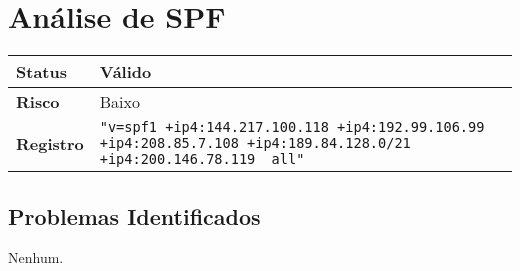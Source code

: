 
    \section{Análise de SPF}
    \begin{tabularx}{\textwidth}{|l|X|}
    \hline
    \textbf{Status} & Válido \\ \hline
    \textbf{Risco} & Baixo \\ \hline
    \textbf{Registro} & \texttt{"v=spf1 +ip4:144.217.100.118 +ip4:192.99.106.99 +ip4:208.85.7.108  +ip4:189.84.128.0/21 +ip4:200.146.78.119 ~all"} \\ \hline
    \end{tabularx}

    \subsection*{Problemas Identificados}
    Nenhum.
    